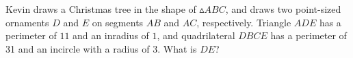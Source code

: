 Kevin draws a Christmas tree in the shape of $\vartriangle ABC$, and draws two point-sized ornaments $D$ and $E$ on segments $AB$ and $AC$, respectively. Triangle $ADE$ has a perimeter of $11$ and an inradius of $1$, and quadrilateral $DBCE$ has a perimeter of 31 and an incircle with a radius of $3$. What is $DE$?
